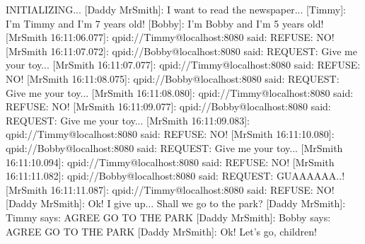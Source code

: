 		\begin{codigo}
INITIALIZING...
[Daddy MrSmith]: I want to read the newspaper...
[Timmy]: I'm Timmy and I'm 7 years old!
[Bobby]: I'm Bobby and I'm 5 years old!
[MrSmith 16:11:06.077]: qpid://Timmy@localhost:8080
	said: REFUSE: NO!
[MrSmith 16:11:07.072]: qpid://Bobby@localhost:8080
	said: REQUEST: Give me your toy...
[MrSmith 16:11:07.077]: qpid://Timmy@localhost:8080
	said: REFUSE: NO!
[MrSmith 16:11:08.075]: qpid://Bobby@localhost:8080
	said: REQUEST: Give me your toy...
[MrSmith 16:11:08.080]: qpid://Timmy@localhost:8080
	said: REFUSE: NO!
[MrSmith 16:11:09.077]: qpid://Bobby@localhost:8080
	said: REQUEST: Give me your toy...
[MrSmith 16:11:09.083]: qpid://Timmy@localhost:8080
	said: REFUSE: NO!
[MrSmith 16:11:10.080]: qpid://Bobby@localhost:8080
	said: REQUEST: Give me your toy...
[MrSmith 16:11:10.094]: qpid://Timmy@localhost:8080
	said: REFUSE: NO!
[MrSmith 16:11:11.082]: qpid://Bobby@localhost:8080
	said: REQUEST: GUAAAAAA..!
[MrSmith 16:11:11.087]: qpid://Timmy@localhost:8080
	said: REFUSE: NO!
[Daddy MrSmith]: Ok! I give up... Shall we go to the park?
[Daddy MrSmith]: Timmy says: AGREE GO TO THE PARK
[Daddy MrSmith]: Bobby says: AGREE GO TO THE PARK
[Daddy MrSmith]: Ok! Let's go, children!
		\end{codigo}
